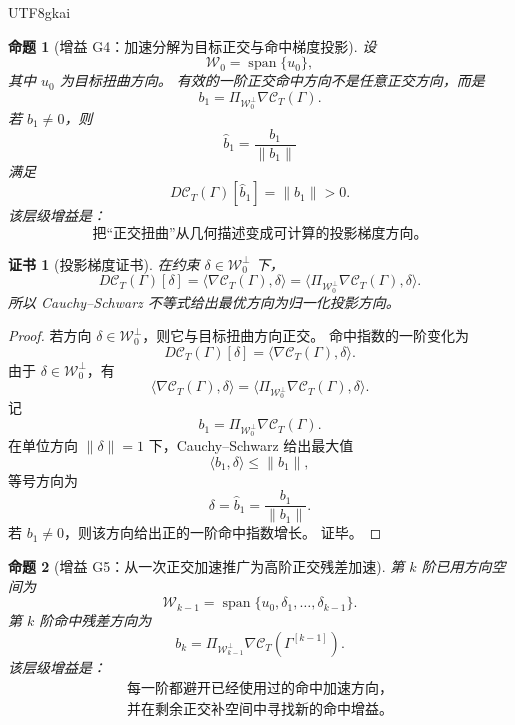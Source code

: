 \documentclass[12pt]{article}
\newtheorem{proposition}{命题}[section]
\newtheorem{Certificate}{证书}[section]
\begin{document}
\begin{CJK*}{UTF8}{gkai}
\begin{proposition}[增益 G4：加速分解为目标正交与命中梯度投影]
\label{prop:tex55-gain-orthogonal-projection}
设
\[
  \mathcal W_0=\operatorname{span}\{u_0\},
\]
其中 \(u_0\) 为目标扭曲方向。
有效的一阶正交命中方向不是任意正交方向，而是
\[
  b_1
  =
  \Pi_{\mathcal W_0^\perp}
  \nabla\mathcal C_T(\Gamma).
\]
若 \(b_1\neq0\)，则
\[
  \widehat b_1=\frac{b_1}{\lVert b_1\rVert}
\]
满足
\[
  D\mathcal C_T(\Gamma)[\widehat b_1]
  =
  \lVert b_1\rVert>0.
\]
该层级增益是：
\[
  \boxed{
  \text{把“正交扭曲”从几何描述变成可计算的投影梯度方向。}
  }
\]
\end{proposition}

\begin{Certificate}[投影梯度证书]
\label{cert:tex55-gain-orthogonal-projection}
在约束 \(\delta\in\mathcal W_0^\perp\) 下，
\[
  D\mathcal C_T(\Gamma)[\delta]
  =
  \langle\nabla\mathcal C_T(\Gamma),\delta\rangle
  =
  \langle
  \Pi_{\mathcal W_0^\perp}\nabla\mathcal C_T(\Gamma),
  \delta
  \rangle.
\]
所以 Cauchy--Schwarz 不等式给出最优方向为归一化投影方向。
\end{Certificate}

\begin{proof}
若方向 \(\delta\in\mathcal W_0^\perp\)，则它与目标扭曲方向正交。
命中指数的一阶变化为
\[
  D\mathcal C_T(\Gamma)[\delta]
  =
  \langle\nabla\mathcal C_T(\Gamma),\delta\rangle.
\]
由于 \(\delta\in\mathcal W_0^\perp\)，有
\[
  \langle\nabla\mathcal C_T(\Gamma),\delta\rangle
  =
  \langle
  \Pi_{\mathcal W_0^\perp}\nabla\mathcal C_T(\Gamma),
  \delta
  \rangle.
\]
记
\[
  b_1=
  \Pi_{\mathcal W_0^\perp}\nabla\mathcal C_T(\Gamma).
\]
在单位方向 \(\lVert\delta\rVert=1\) 下，Cauchy--Schwarz 给出最大值
\[
  \langle b_1,\delta\rangle\le\lVert b_1\rVert,
\]
等号方向为
\[
  \delta=\widehat b_1=\frac{b_1}{\lVert b_1\rVert}.
\]
若 \(b_1\neq0\)，则该方向给出正的一阶命中指数增长。
证毕。
\end{proof}

\begin{proposition}[增益 G5：从一次正交加速推广为高阶正交残差加速]
\label{prop:tex55-gain-higher-order-residual}
第 \(k\) 阶已用方向空间为
\[
  \mathcal W_{k-1}
  =
  \operatorname{span}\{u_0,\delta_1,\ldots,\delta_{k-1}\}.
\]
第 \(k\) 阶命中残差方向为
\[
  b_k
  =
  \Pi_{\mathcal W_{k-1}^\perp}
  \nabla\mathcal C_T(\Gamma^{[k-1]}).
\]
该层级增益是：
\[
  \boxed{
  \begin{gathered}
  \text{每一阶都避开已经使用过的命中加速方向，}\\
  \text{并在剩余正交补空间中寻找新的命中增益。}
  \end{gathered}
  }
\]
\end{proposition}


\end{CJK*}
\end{document}

